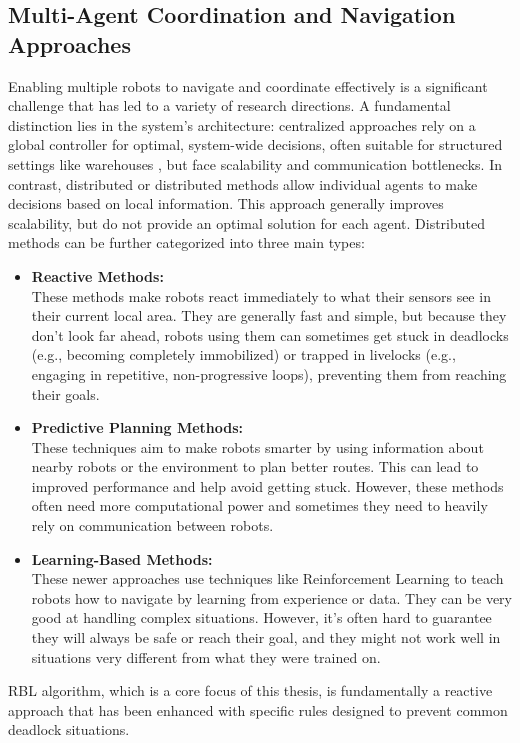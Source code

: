   \subsection{Multi-Agent Coordination and Navigation Approaches}
    Enabling multiple robots to navigate and coordinate effectively is a significant challenge that has led to a variety of research directions.
    A fundamental distinction lies in the system's architecture: centralized approaches rely on a global controller for optimal, system-wide decisions, often suitable for structured settings like warehouses \cite{warehouse_intro}, but face scalability and communication bottlenecks.
    In contrast, distributed or distributed methods allow individual agents to make decisions based on local information.
    This approach generally improves scalability, but do not provide an optimal solution for each agent. 
    Distributed methods can be further categorized into three main types: 
    \begin{itemize}
      \item \textbf{Reactive Methods: } \\
        These methods \cite{reactive1, reactive2} make robots react immediately to what their sensors see in their current local area. 
        They are generally fast and simple, but because they don't look far ahead, robots using them can sometimes get stuck in deadlocks (e.g., becoming completely immobilized) or trapped in livelocks (e.g., engaging in repetitive, non-progressive loops), preventing them from reaching their goals.
      \item \textbf{Predictive Planning Methods: } \\
        These techniques \cite{predictive1, predictive2} aim to make robots smarter by using information about nearby robots or the environment to plan better routes. 
        This can lead to improved performance and help avoid getting stuck. 
        However, these methods often need more computational power and sometimes they need to heavily rely on communication between robots.
      \item \textbf{Learning-Based Methods: } \\
        These newer approaches \cite{rl1, rl2} use techniques like Reinforcement Learning to teach robots how to navigate by learning from experience or data. 
        They can be very good at handling complex situations. 
        However, it's often hard to guarantee they will always be safe or reach their goal, and they might not work well in situations very different from what they were trained on.
    \end{itemize}
    \ac{RBL} algorithm, which is a core focus of this thesis, is fundamentally a reactive approach that has been enhanced with specific rules designed to prevent common deadlock situations.


